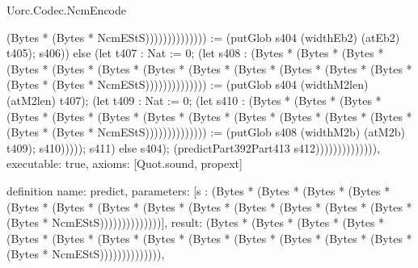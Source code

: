 \begin{lexlean}{Uorc.Codec.NcmEncode}
\begin{semanticmodule}
{(Bytes * (Bytes * NcmEStS)))))))))))))) := (putGlob s404 (widthEb2) (atEb2) t405); s406)) else (let t407 : Nat := 0; (let s408 : (Bytes * (Bytes * (Bytes * (Bytes * (Bytes * (Bytes * (Bytes * (Bytes * (Bytes * (Bytes * (Bytes * (Bytes * (Bytes * (Bytes * NcmEStS)))))))))))))) := (putGlob s404 (widthM2len) (atM2len) t407); (let t409 : Nat := 0; (let s410 : (Bytes * (Bytes * (Bytes * (Bytes * (Bytes * (Bytes * (Bytes * (Bytes * (Bytes * (Bytes * (Bytes * (Bytes * (Bytes * (Bytes * NcmEStS)))))))))))))) := (putGlob s408 (widthM2b) (atM2b) t409); s410))))); s411) else s404); (predictPart392Part413 s412)))))))))))))),
  executable: true,
  axioms: [Quot.sound, propext]
}

definition{
  name: predict,
  parameters: [s : (Bytes * (Bytes * (Bytes * (Bytes * (Bytes * (Bytes * (Bytes * (Bytes * (Bytes * (Bytes * (Bytes * (Bytes * (Bytes * (Bytes * NcmEStS))))))))))))))],
  result: (Bytes * (Bytes * (Bytes * (Bytes * (Bytes * (Bytes * (Bytes * (Bytes * (Bytes * (Bytes * (Bytes * (Bytes * (Bytes * (Bytes * NcmEStS)))))))))))))),
}
\end{semanticmodule}
\end{lexlean}
